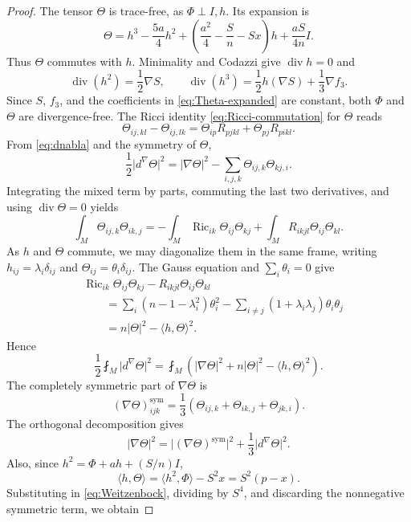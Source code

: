 \documentclass[11pt,reqno]{amsart}
\numberwithin{equation}{section}
\newcommand{\Ric}{\operatorname{Ric}}
\newcommand{\diver}{\operatorname{div}}
\newcommand{\ip}[2]{\langle #1,#2\rangle}
\newcommand{\norm}[1]{\lvert #1\rvert}
\begin{document}
\begin{proof}
The tensor $\Theta$ is trace-free, as $\Phi\perp I,h$. Its expansion is
\begin{equation}\label{eq:Theta-expanded}
\Theta=h^3-\frac{5a}{4}h^2
+\left(\frac{a^2}{4}-\frac Sn-Sx\right)h
+\frac{aS}{4n}I.
\end{equation}
Thus $\Theta$ commutes with $h$. Minimality and Codazzi give $\diver h=0$ and
\[
\diver(h^2)=\frac12\nabla S,
\qquad
\diver(h^3)=\frac12h(\nabla S)+\frac13\nabla f_3.
\]
Since $S$, $f_3$, and the coefficients in \eqref{eq:Theta-expanded} are constant, both $\Phi$ and $\Theta$ are divergence-free.
The Ricci identity \eqref{eq:Ricci-commutation} for $\Theta$ reads
\[
\Theta_{ij,kl}-\Theta_{ij,lk}
=\Theta_{ip}R_{pjkl}+\Theta_{pj}R_{pikl}.
\]
From \eqref{eq:dnabla} and the symmetry of $\Theta$,
\[
\frac12\norm{d^\nabla\Theta}^2
=\norm{\nabla\Theta}^2
-\sum_{i,j,k}\Theta_{ij,k}\Theta_{kj,i}.
\]
Integrating the mixed term by parts, commuting the last two derivatives, and using $\diver\Theta=0$ yields
\[
\int_M \Theta_{ij,k}\Theta_{ik,j}
=-\int_M\Ric_{ik}\Theta_{ij}\Theta_{kj}
+\int_M R_{ikjl}\Theta_{ij}\Theta_{kl}.
\]
As $h$ and $\Theta$ commute, we may diagonalize them in the same frame, writing
$h_{ij}=\lambda_i\delta_{ij}$ and $\Theta_{ij}=\theta_i\delta_{ij}$. The Gauss equation and $\sum_i\theta_i=0$ give
\begin{align*}
&\Ric_{ik}\Theta_{ij}\Theta_{kj}-R_{ikjl}\Theta_{ij}\Theta_{kl}\\
&\qquad=\sum_i(n-1-\lambda_i^2)\theta_i^2
-\sum_{i\ne j}(1+\lambda_i\lambda_j)\theta_i\theta_j\\
&\qquad=n\norm\Theta^2-\ip{h}{\Theta}^2.
\end{align*}
Hence
\begin{equation}\label{eq:Weitzenbock}
\frac12\fint_M\norm{d^\nabla\Theta}^2
=\fint_M\left(\norm{\nabla\Theta}^2+n\norm\Theta^2-\ip{h}{\Theta}^2\right).
\end{equation}
The completely symmetric part of $\nabla\Theta$ is
\[
(\nabla\Theta)^{\mathrm{sym}}_{ijk}
=\frac13(\Theta_{ij,k}+\Theta_{ik,j}+\Theta_{jk,i}).
\]
The orthogonal decomposition gives
\[
\norm{\nabla\Theta}^2
=\norm{(\nabla\Theta)^{\mathrm{sym}}}^2
+\frac13\norm{d^\nabla\Theta}^2.
\]
Also, since $h^2=\Phi+ah+(S/n)I$,
\begin{equation}\label{eq:hTheta}
\ip h\Theta=\ip{h^2}{\Phi}-S^2x=S^2(p-x).
\end{equation}
Substituting in \eqref{eq:Weitzenbock}, dividing by $S^4$, and discarding the nonnegative symmetric term, we obtain

\end{proof}
\end{document}
